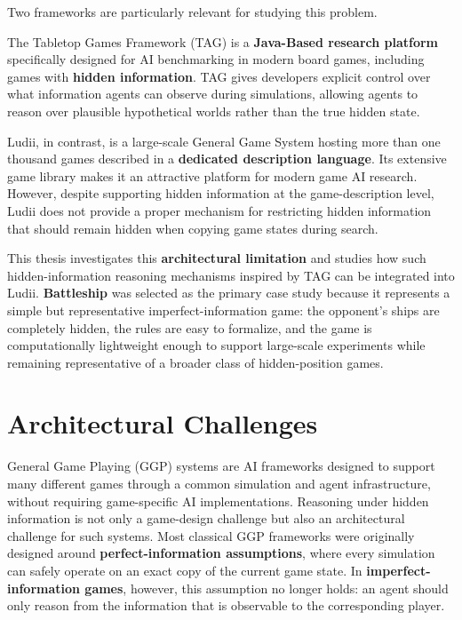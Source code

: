 Two frameworks are particularly relevant for studying this problem.

The Tabletop Games Framework (TAG)\cite{gaina2020tag} is a \textbf{Java-Based research platform} specifically designed for AI benchmarking in modern board games, including games with \textbf{hidden information}. TAG gives developers explicit control over what information agents can observe during simulations, allowing agents to reason over plausible hypothetical worlds rather than the true hidden state.

Ludii\cite{piette2020ludii}, in contrast, is a large-scale General Game System hosting more than one thousand games described in a \textbf{dedicated description language}\cite{browne2020ludii_language}. Its extensive game library\cite{crist2024ludii_database} makes it an attractive platform for modern game AI research\cite{stephenson2019competition}. However, despite supporting hidden information at the game-description level, Ludii does not provide a proper mechanism for restricting hidden information that should remain hidden when copying game states during search. 

This thesis investigates this \textbf{architectural limitation} and studies how such hidden-information reasoning mechanisms inspired by TAG can be integrated into Ludii. \textbf{Battleship} was selected as the primary case study because it represents a simple but representative imperfect-information game: the opponent's ships are completely hidden, the rules are easy to formalize, and the game is computationally lightweight enough to support large-scale experiments while remaining representative of a broader class of hidden-position games.

\section{Architectural Challenges}
General Game Playing (GGP)\cite{Genesereth2005GeneralGP} systems are AI frameworks designed to support many different games through a common simulation and agent infrastructure, without requiring game-specific AI implementations. Reasoning under hidden information is not only a game-design challenge but also an architectural challenge for such systems. Most classical GGP frameworks were originally designed around \textbf{perfect-information assumptions}, where every simulation can safely operate on an exact copy of the current game state\cite{Love+al:2006}. In \textbf{imperfect-information games}, however, this assumption no longer holds: an agent should only reason from the information that is observable to the corresponding player.

